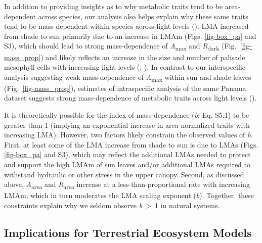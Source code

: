 \documentclass[
  12pt,
  letterpaper,
  DIV=11,
  numbers=noendperiod]{scrartcl}
\begin{document}
In addition to providing insights as to why metabolic traits tend to be
area-dependent across species, our analysis also helps explain why these
same traits tend to be mass-dependent within species across light levels
(). LMA increased from shade
to sun primarily due to an increase in LMAm (Figs. \ref{fig-box_pa} and
S3), which should lead to strong mass-dependence of
\emph{A}\textsubscript{max} and \emph{R}\textsubscript{dark}
(Fig.~\ref{fig-mass_prop}) and likely reflects an increase in the size
and number of palisade mesophyll cells with increasing light levels
(;
). In contrast to our
interspecific analysis suggesting weak mass-dependence of
\emph{A}\textsubscript{max} within sun and shade leaves
(Fig.~\ref{fig-mass_prop}), estimates of intraspecific analysis of the
same Panama dataset suggests strong mass-dependence of metabolic traits
across light levels ().

It is theoretically possible for the index of mass-dependence (\emph{b};
Eq. S5.1) to be greater than 1 (implying an exponential increase in
area-normalized traits with increasing LMA). However, two factors likely
constrain the observed values of \emph{b}. First, at least some of the
LMA increase from shade to sun is due to LMAs (Figs. \ref{fig-box_pa}
and S3), which may reflect the additional LMAs needed to protect and
support the high LMAm of sun leaves and/or additional LMAs required to
withstand hydraulic or other stress in the upper canopy. Second, as
discussed above, \emph{A}\textsubscript{area} and
\emph{R}\textsubscript{area} increase at a less-than-proportional rate
with increasing LMAm, which in turn moderates the LMA scaling exponent
(\emph{b}). Together, these constraints explain why we seldom observe
\emph{b}~\textgreater~1 in natural systems.

\subsection{Implications for Terrestrial Ecosystem
Models}\label{implications-for-terrestrial-ecosystem-models}
\end{document}

